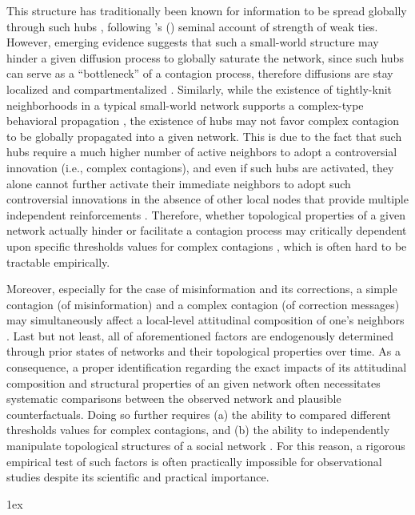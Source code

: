\documentclass[man, 12pt, a4paper, noextraspace]{apa6}
\begin{document}
    This structure has traditionally been known for information to be spread globally through such hubs \parencite[e.g.,][]{Bakshy_2012}, following \citeauthor{granovetter1977strength}'s (\citeyear{granovetter1977strength}) seminal account of strength of weak ties. However, emerging evidence suggests that such a small-world structure may hinder a given diffusion process to globally saturate the network, since such hubs can serve as a \enquote{bottleneck} of a contagion process, therefore diffusions are stay localized and compartmentalized \parencite[e.g.,][]{banos2013diffusion, centola2007complex}. Similarly, while the existence of tightly-knit neighborhoods in a typical small-world network supports a complex-type behavioral propagation \parencite[i.e., an innovation that runs counter to prevalent norms and values:][]{Centola2010Sience}, the existence of hubs may not favor complex contagion to be globally propagated into a given network. This is due to the fact that such hubs require a much higher number of active neighbors to adopt a controversial innovation (i.e., complex contagions), and even if such hubs are activated, they alone cannot further activate their immediate neighbors to adopt such controversial innovations in the absence of other local nodes that provide multiple independent reinforcements \parencite{Centola2007449}. Therefore, whether topological properties of a given network actually hinder or facilitate a contagion process may critically dependent upon specific thresholds values for complex contagions \parencite[e.g.,][]{Centola2007449}, which is often hard to be tractable empirically.   
    
    Moreover, especially for the case of misinformation and its corrections, a simple contagion (of misinformation) and a complex contagion (of correction messages) may simultaneously affect a local-level attitudinal composition of one's neighbors \parencite[i.e., those who endorse and believe misinformation vs. those who do not: e.g.,][]{campbell2013complex}. Last but not least, all of aforementioned factors are endogenously determined through prior states of networks and their topological properties over time. As a consequence, a proper identification regarding the exact impacts of its attitudinal composition and structural properties of an given network often necessitates systematic comparisons between the observed network and plausible counterfactuals. Doing so further requires (a) the ability to compared different thresholds values for complex contagions, and (b) the ability to independently manipulate topological structures of a social network \parencite[e.g.,][]{Centola2010Sience, Centola2007449}. For this reason, a rigorous empirical test of such factors is often practically impossible for observational studies despite its scientific and practical importance. 
    




\printbibliography
\newpage
\begingroup
\parindent 0pt
\parskip 1ex
\def\enotesize{\normalsize}
\theendnotes
\endgroup
\end{document}
